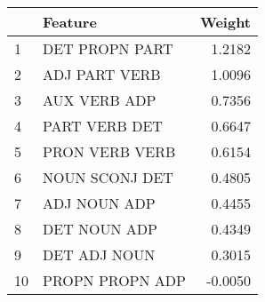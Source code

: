 \begin{tabular}{llr}
\toprule
{} &          Feature &  Weight \\
\midrule
1  &   DET PROPN PART &  1.2182 \\
2  &    ADJ PART VERB &  1.0096 \\
3  &     AUX VERB ADP &  0.7356 \\
4  &    PART VERB DET &  0.6647 \\
5  &   PRON VERB VERB &  0.6154 \\
6  &   NOUN SCONJ DET &  0.4805 \\
7  &     ADJ NOUN ADP &  0.4455 \\
8  &     DET NOUN ADP &  0.4349 \\
9  &     DET ADJ NOUN &  0.3015 \\
10 &  PROPN PROPN ADP & -0.0050 \\
\bottomrule
\end{tabular}
